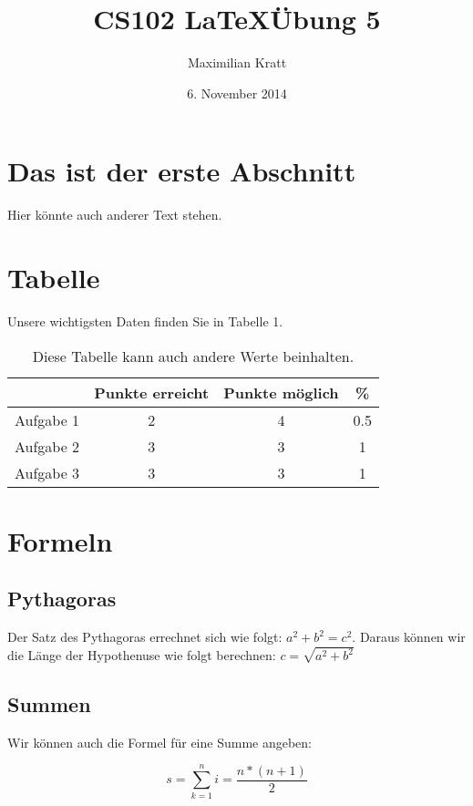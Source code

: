 \documentclass[11pt,a4paper]{article}
\date{6. November 2014}
\author{Maximilian Kratt}
\title{CS102   \LaTeX    \"Ubung 5}
\begin{document}
\maketitle
\section{Das ist der erste Abschnitt}
Hier k\"onnte auch anderer Text stehen.
\section{Tabelle}
Unsere wichtigsten Daten finden Sie in Tabelle 1.
\begin{table} [htbp]
\centering
\begin{tabular}{c|c|c|c}
  & Punkte erreicht & Punkte m\"oglich & \% \\
\hline
Aufgabe 1 & 2 & 4 & 0.5 \\
Aufgabe 2 & 3 & 3 & 1 \\
Aufgabe 3 & 3 & 3 & 1 \\
\end{tabular}
\caption{Diese Tabelle kann auch andere Werte beinhalten.}
\end{table}

\section{Formeln}
\subsection{Pythagoras}
Der Satz des Pythagoras errechnet sich wie folgt: $a^2+b^2=c^2$. Daraus k\"onnen wir die L\"ange der Hypothenuse wie folgt berechnen: $c=\sqrt{a^2+b^2}$
\subsection{Summen}
Wir k\"onnen auch die Formel f\"ur eine Summe angeben:

\begin{equation}
s = \sum_{k=1}^ni=\frac{n*(n+1)}{2}
\end{equation}
\end{document}
